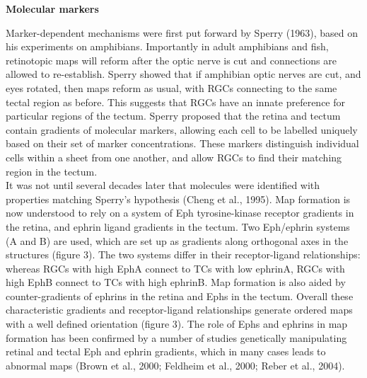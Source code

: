 \documentclass[11pt]{"article"}
\begin{document}
\vspace*{10pt}

\textbf{Molecular markers}

{
Marker-dependent mechanisms were first put forward by Sperry (1963), based on his experiments on amphibians. Importantly in adult amphibians and fish, retinotopic maps will reform after the optic nerve is cut and connections are allowed to re-establish. Sperry showed that if amphibian optic nerves are cut, and eyes rotated, then maps reform as usual, with RGCs connecting to the same tectal region as before. This suggests that RGCs have an innate preference for particular regions of the tectum. Sperry proposed that the retina and tectum contain gradients of molecular markers, allowing each cell to be labelled uniquely based on their set of marker concentrations. These markers distinguish individual cells within a sheet from one another, and allow RGCs to find their matching region in the tectum.  
\\

It was not until several decades later that molecules were identified with properties matching Sperry's hypothesis (Cheng et al., 1995). Map formation is now understood to rely on a system of Eph tyrosine-kinase receptor gradients in the retina, and ephrin ligand gradients in the tectum. Two Eph/ephrin systems (A and B) are used, which are set up as gradients along orthogonal axes in the structures (figure 3). The two systems differ in their receptor-ligand relationships: whereas RGCs with high EphA connect to TCs with low ephrinA, RGCs with high EphB connect to TCs with high ephrinB. Map formation is also aided by counter-gradients of ephrins in the retina and Ephs in the tectum. Overall these characteristic gradients and receptor-ligand relationships generate ordered maps with a well defined orientation (figure 3). The role of Ephs and ephrins in map formation has been confirmed by a number of studies genetically manipulating retinal and tectal Eph and ephrin gradients, which in many cases leads to abnormal maps (Brown et al., 2000; Feldheim et al., 2000; Reber et al., 2004).\par
}
\end{document}
